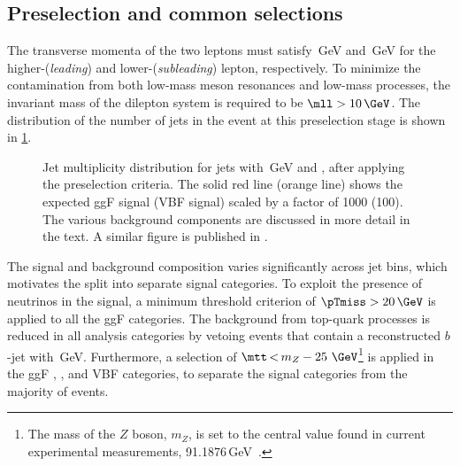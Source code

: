 \subsection{Preselection and common selections}
\label{subsec:preselection}
The transverse momenta of the two leptons must satisfy \,GeV and \,GeV for the higher-\pT (\emph{leading}) and lower-\pT (\emph{subleading}) lepton, respectively.
To minimize the contamination from both low-mass meson resonances and low-mass \Ztautau processes, the invariant mass of the dilepton system is required to be $\mll > 10\,\GeV$.
The distribution of the number of jets in the event at this preselection stage is shown in \cref{fig:njet-dist}.
\begin{figure}
  \caption{Jet multiplicity distribution for jets with \,GeV and , after applying the preselection criteria. The solid red line (orange line) shows the expected ggF signal (VBF signal) scaled by a factor of 1000 (100). The various background components are discussed in more detail in the text. A similar figure is published in .}
  \label{fig:njet-dist}
\end{figure}
The signal and background composition varies significantly across jet bins, which motivates the split into separate \Njet signal categories.
To exploit the presence of neutrinos in the signal, a minimum threshold criterion of $\pTmiss > 20\,\GeV$ is applied to all the ggF categories.
The background from top-quark processes is reduced in all analysis categories by vetoing events that contain a reconstructed $b$-jet with \,GeV.
Furthermore, a selection of $\mtt\,{<}\,m_Z - 25~\GeV$\footnote{The mass of the $Z$ boson, $m_Z$, is set to the central value found in current experimental measurements, 91.1876\,GeV~\cite{PDG2020}.} is applied in the ggF \OneJet, \TwoJet, and VBF \TwoJet categories, to separate the signal categories from the majority of \Zgamma events.


